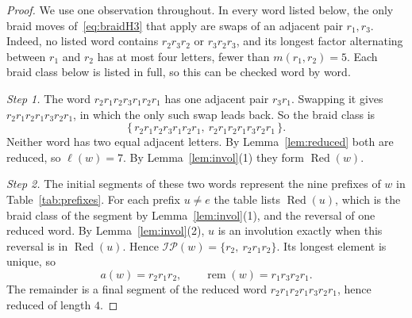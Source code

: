 \documentclass[11pt]{amsart}
\theoremstyle{definition}\newtheorem{definition}[theorem]{Definition}
\theoremstyle{remark}\newtheorem{remark}[theorem]{Remark}
\newcommand{\IP}{\mathcal{IP}}
\DeclareMathOperator{\rem}{rem}
\DeclareMathOperator{\Red}{Red}
\begin{document}
\begin{proof}
We use one observation throughout. In every word listed below, the only braid moves of~\eqref{eq:braidH3} that apply are swaps of an adjacent pair \(r_1,r_3\). Indeed, no listed word contains \(r_2r_3r_2\) or \(r_3r_2r_3\), and its longest factor alternating between \(r_1\) and \(r_2\) has at most four letters, fewer than \(m(r_1,r_2)=5\). Each braid class below is listed in full, so this can be checked word by word.

\emph{Step 1.} The word \(r_2r_1r_2r_3r_1r_2r_1\) has one adjacent pair \(r_3r_1\). Swapping it gives \(r_2r_1r_2r_1r_3r_2r_1\), in which the only such swap leads back. So the braid class is
\[
\{\,r_2r_1r_2r_3r_1r_2r_1,\ r_2r_1r_2r_1r_3r_2r_1\,\}.
\]
Neither word has two equal adjacent letters. By Lemma~\ref{lem:reduced} both are reduced, so \(\ell(w)=7\). By Lemma~\ref{lem:invol}(1) they form \(\Red(w)\).

\emph{Step 2.} The initial segments of these two words represent the nine prefixes of \(w\) in Table~\ref{tab:prefixes}. For each prefix \(u\neq e\) the table lists \(\Red(u)\), which is the braid class of the segment by Lemma~\ref{lem:invol}(1), and the reversal of one reduced word. By Lemma~\ref{lem:invol}(2), \(u\) is an involution exactly when this reversal is in \(\Red(u)\). Hence \(\IP(w)=\{r_2,\ r_2r_1r_2\}\). Its longest element is unique, so
\[
a(w)=r_2r_1r_2,\qquad \rem(w)=r_1r_3r_2r_1.
\]
The remainder is a final segment of the reduced word \(r_2r_1r_2r_1r_3r_2r_1\), hence reduced of length \(4\).


\end{proof}
\end{document}
